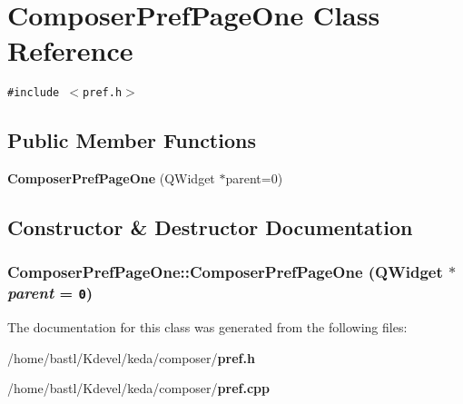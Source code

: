 \section{Composer\-Pref\-Page\-One Class Reference}
\label{classComposerPrefPageOne}
{\tt \#include $<$pref.h$>$}

\subsection*{Public Member Functions}
\begin{CompactItemize}
\item 
{\bf Composer\-Pref\-Page\-One} (QWidget $\ast$parent=0)
\end{CompactItemize}


\subsection{Constructor \& Destructor Documentation}
\subsubsection{\setlength{\rightskip}{0pt plus 5cm}Composer\-Pref\-Page\-One::Composer\-Pref\-Page\-One (QWidget $\ast$ {\em parent} = {\tt 0})}\label{classComposerPrefPageOne_f4cbe4587f269d878839b7040b1dd43b}




The documentation for this class was generated from the following files:\begin{CompactItemize}
\item 
/home/bastl/Kdevel/keda/composer/{\bf pref.h}\item 
/home/bastl/Kdevel/keda/composer/{\bf pref.cpp}\end{CompactItemize}
